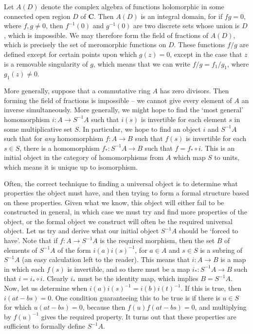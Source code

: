 \begin{example}
    Let $A(D)$ denote the complex algebra of functions holomorphic in some connected open region $D$ of $\mathbf{C}$. Then $A(D)$ is an integral domain, for if $fg = 0$, where $f,g \neq 0$, then $f^{-1}(0)$ and $g^{-1}(0)$ are two discrete sets whose union is $D$, which is impossible. We may therefore form the field of fractions of $A(D)$, which is precisely the set of meromorphic functions on $D$. These functions $f/g$ are defined except for certain points upon which $g(z) = 0$, except in the case that $z$ is a removable singularity of $g$, which means that we can write $f/g = f_1/g_1$, where $g_1(z) \neq 0$.
\end{example}

More generally, suppose that a commutative ring $A$ has zero divisors. Then forming the field of fractions is impossible -- we cannot give every element of $A$ an inverse simultaneously. More generally, we might hope to find the `most general' homomorphism $i: A \to S^{-1}A$ such that $i(s)$ is invertible for each element $s$ in some multiplicative set $S$. In particular, we hope to find an object $i$ and $S^{-1}A$ such that for {\it any} homomorphism $f: A \to B$ such that $f(s)$ is invertible for each $s \in S$, there is a homomorphism $f_*: S^{-1}A \to B$ such that $f = f_* \circ i$. This is an initial object in the category of homomorphisms from $A$ which map $S$ to units, which means it is unique up to isomorphism.

Often, the correct technique to finding a universal object is to determine what properties the object must have, and then trying to form a formal structure based on these properties. Given what we know, this object will either fail to be constructed in general, in which case we must try and find more properties of the object, or the formal object we construct will often be the required universal object. Let us try and derive what our initial object $S^{-1}A$ should be `forced to have'. Note that if $f: A \to S^{-1}A$ is the required morphism, then the set $B$ of elements of $S^{-1}A$ of the form $i(a)i(s)^{-1}$, for $a \in A$ and $s \in S$ is a subring of $S^{-1}A$ (an easy calculation left to the reader). This means that $i: A \to B$ is a map in which each $f(s)$ is invertible, and so there must be a map $i_*: S^{-1}A \to B$ such that $i = i_* \circ i$. Clearly $i_*$ must be the identity map, which implies $B = S^{-1}A$. Now, let us determine when $i(a)i(s)^{-1} = i(b)i(t)^{-1}$. If this is true, then $i(at - bs) = 0$. One condition guaranteeing this to be true is if there is $u \in S$ for which $u(at - bs) = 0$, because then $f(u)f(at-bs) = 0$, and multiplying by $f(u)^{-1}$ gives the required property. It turns out that these properties are sufficient to formally define $S^{-1}A$.

